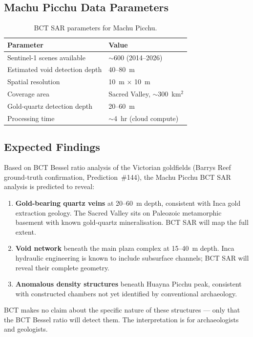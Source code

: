 \documentclass[twocolumn,10pt]{article}
\begin{document}
\subsection{Machu Picchu Data Parameters}

\begin{table}[h]
\centering
\begin{tabular}{@{}ll@{}}
\toprule
Parameter & Value \\
\midrule
Sentinel-1 scenes available & $\sim$600 (2014--2026) \\
Estimated void detection depth & 40--80~m \\
Spatial resolution & 10~m $\times$ 10~m \\
Coverage area & Sacred Valley, $\sim$300~km$^2$ \\
Gold-quartz detection depth & 20--60~m \\
Processing time & $\sim$4~hr (cloud compute) \\
\bottomrule
\end{tabular}
\caption{BCT SAR parameters for Machu Picchu.}
\end{table}

\subsection{Expected Findings}

Based on BCT Bessel ratio analysis of the Victorian goldfields (Barrys Reef ground-truth
confirmation, Prediction~\#144), the Machu Picchu BCT SAR analysis is predicted to reveal:

\begin{enumerate}
\item \textbf{Gold-bearing quartz veins} at 20--60~m depth, consistent with Inca gold
  extraction geology. The Sacred Valley sits on Paleozoic metamorphic basement with
  known gold-quartz mineralisation. BCT SAR will map the full extent.
\item \textbf{Void network} beneath the main plaza complex at 15--40~m depth. Inca
  hydraulic engineering is known to include subsurface channels; BCT SAR will reveal
  their complete geometry.
\item \textbf{Anomalous density structures} beneath Huayna Picchu peak, consistent
  with constructed chambers not yet identified by conventional archaeology.
\end{enumerate}

BCT makes no claim about the specific nature of these structures --- only that the
BCT Bessel ratio will detect them. The interpretation is for archaeologists and geologists.
\end{document}
